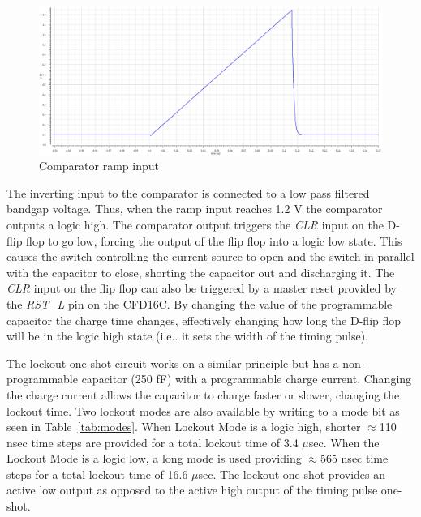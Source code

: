 \documentclass[12pt,oneside,final]{siuethesis}
\theoremstyle{definition}
\begin{document}
\begin{figure}[htbp!]
\centering
\includegraphics[scale=.3,keepaspectratio=true]{./ch3_figures/ramp.png} 
\caption{Comparator ramp input}
\label{fig:ramp}
\end{figure}

\par The inverting input to the comparator is connected to a low pass filtered bandgap voltage. Thus, when the ramp input reaches 1.2 V the comparator outputs a logic high. The comparator output triggers the \emph{CLR} input on the D-flip flop to go low, forcing the output of the flip flop into a logic low state. This causes the switch controlling the current source to open and the switch in parallel with the capacitor to close, shorting the capacitor out and discharging it. The \emph{CLR} input on the flip flop can also be triggered by a master reset provided by the \emph{RST\_L} pin on the CFD16C.  By changing the value of the programmable capacitor the charge time changes, effectively changing how long the D-flip flop will be in the logic high state (i.e.. it sets the width of the timing pulse). 

\par The lockout one-shot circuit works on a similar principle but has a non-programmable capacitor (250 fF) with a programmable charge current. Changing the charge current allows the capacitor to charge faster or slower, changing the lockout time. Two lockout modes are also available by writing to a mode bit as seen in Table~\ref{tab:modes}. When Lockout Mode is a logic high, shorter $\approx$110 nsec time steps are provided for a total lockout time of 3.4 $\mu$sec. When the Lockout Mode is a logic low, a long mode is used providing $\approx$565 nsec time steps for a total lockout time of 16.6 $\mu$sec. The lockout one-shot provides an active low output as opposed to the active high output of the timing pulse one-shot.
\end{document}
